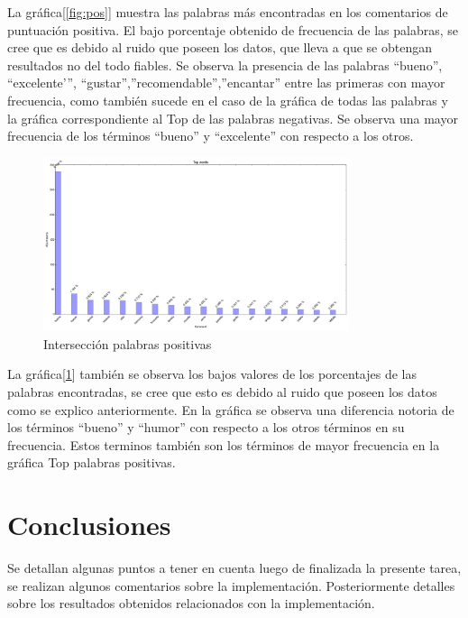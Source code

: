 \documentclass[12pt]{article}
\begin{document}
La gráfica[\ref{fig:pos}] muestra las palabras más encontradas en los comentarios de puntuación positiva. El bajo porcentaje obtenido de frecuencia de las palabras, se cree que es debido al ruido que poseen los datos, que lleva a que se obtengan resultados no del todo fiables. Se observa la presencia de las palabras “bueno”, “excelente'”, “gustar”,”recomendable”,”encantar” entre las primeras con mayor frecuencia, como también sucede en el caso de la gráfica de todas las palabras y la gráfica correspondiente al Top de las palabras negativas. Se observa una mayor frecuencia de los términos “bueno” y “excelente” con respecto a los otros.


\begin{figure}[!h]
  \centering
    \includegraphics[width=0.8\textwidth]{./fig/PositiveSubjetiveWords.png}
  \caption{Intersección palabras positivas}
  \label{fig:possub}
\end{figure} 


La gráfica[\ref{fig:possub}] también se observa los bajos valores de los porcentajes de las palabras encontradas, se cree que esto es debido al ruido que poseen los datos como se explico anteriormente. En la gráfica se observa una diferencia notoria de los términos “bueno” y “humor” con respecto a los otros términos en su frecuencia. Estos terminos también son los términos de mayor frecuencia en la gráfica Top palabras positivas.

\section{Conclusiones}\label{conclusions}
Se detallan algunas puntos a tener en cuenta luego de finalizada la presente tarea, se realizan algunos comentarios sobre la implementación. Posteriormente detalles sobre los resultados obtenidos relacionados con la implementación.
\end{document}
